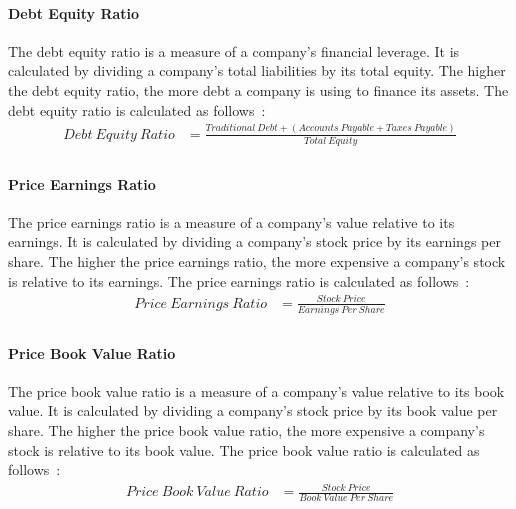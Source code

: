 \documentclass[../xlapes02]{subfiles}
\begin{document}
    \paragraph{Debt Equity Ratio}\label{par:debt-equity-ratio}
    The debt equity ratio is a measure of a company's financial leverage. It is calculated by dividing a company's total liabilities by its total equity. The higher the debt equity ratio, the more debt a company is using to finance its assets. The debt equity ratio is calculated as follows~\cite{investopedia-debt-equity-ratio}:
    \begin{equation}
        \begin{split}
            Debt\ Equity\ Ratio&=\frac{Traditional\ Debt+(Accounts\ Payable+Taxes\ Payable)}{Total\ Equity}\\
        \end{split}
    \end{equation}

    \paragraph{Price Earnings Ratio}\label{par:price-earnings-ratio}
    The price earnings ratio is a measure of a company's value relative to its earnings. It is calculated by dividing a company's stock price by its earnings per share. The higher the price earnings ratio, the more expensive a company's stock is relative to its earnings. The price earnings ratio is calculated as follows~\cite{investopedia-price-earnings-ratio}:
    \begin{equation}
        \begin{split}
            Price\ Earnings\ Ratio&=\frac{Stock\ Price}{Earnings\ Per\ Share}\\
        \end{split}
    \end{equation}

    \paragraph{Price Book Value Ratio}\label{par:price-book-value-ratio}
    The price book value ratio is a measure of a company's value relative to its book value. It is calculated by dividing a company's stock price by its book value per share. The higher the price book value ratio, the more expensive a company's stock is relative to its book value. The price book value ratio is calculated as follows~\cite{investopedia-price-book-value-ratio}:
    \begin{equation}
        \begin{split}
            Price\ Book\ Value\ Ratio&=\frac{Stock\ Price}{Book\ Value\ Per\ Share}\\
        \end{split}
    \end{equation}
\end{document}

